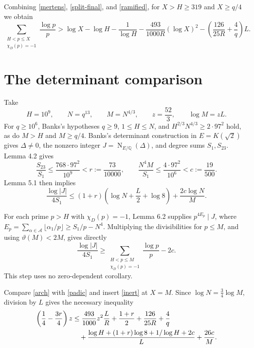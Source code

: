 \documentclass[11pt]{article}
\newcommand{\Q}{\mathbb Q}
\begin{document}
Combining \eqref{mertens}, \eqref{split-final}, and \eqref{ramified},
for \(X>H\ge319\) and \(X\ge q/4\) we obtain
\begin{equation}\label{inert}
 \sum_{\substack{H<p\le X\\\chi_D(p)=-1}}\frac{\log p}{p}
 >\log X-\log H-\frac1{\log H}
  -\frac{493}{1000R}(\log X)^2
  -\left(\frac{126}{25R}+\frac4q\right)L.
\end{equation}

\section{The determinant comparison}

Take
\[
 H=10^9,\qquad N=q^{13},\qquad M=N^{4/3},\qquad
 z=\frac{52}{3},\qquad \log M=zL.
\]
For \(q\ge10^6\), Banks's hypotheses
\(q\ge9\), \(1\le H\le N\), and
\(H^{2/3}N^{4/3}\ge2\cdot97^2\) hold, as do \(M>H\) and \(M\ge q/4\).
Banks's determinant construction in \(E=K(\sqrt2)\) gives
\(\Delta\ne0\), the nonzero integer
\(J=\operatorname{N}_{E/\Q}(\Delta)\), and degree sums \(S_1,S_{23}\).
Lemma 4.2 gives
\[
 \frac{S_{23}}{S_1}\le\frac{768\cdot97^2}{10^9}
                  <r:=\frac{73}{10000},\qquad
 \frac{N^4M}{S_1}\le\frac{4\cdot97^2}{10^6}
                  <c:=\frac{19}{500}.
\]
Lemma 5.1 then implies
\begin{equation}\label{arch}
 \frac{\log|J|}{4S_1}
 \le(1+r)\left(\log N+\frac L2+\log8\right)
                         +\frac{2c\log N}{M}.
\end{equation}

For each prime \(p>H\) with \(\chi_D(p)=-1\), Lemma 6.2 supplies
\(p^{4E_p}\mid J\), where
\(E_p=\sum_{\alpha\in\mathcal A}\lfloor\alpha_1/p\rfloor
\ge S_1/p-N^4\). Multiplying the divisibilities for \(p\le M\), and
using \(\vartheta(M)<2M\), gives directly
\begin{equation}\label{padic}
 \frac{\log|J|}{4S_1}
 \ge\sum_{\substack{H<p\le M\\\chi_D(p)=-1}}\frac{\log p}{p}-2c.
\end{equation}
This step uses no zero-dependent corollary.

Compare \eqref{arch} with \eqref{padic} and insert \eqref{inert}
at \(X=M\). Since \(\log N=\tfrac34\log M\), division by \(L\)
gives the necessary inequality
\begin{align}
 \left(\frac14-\frac{3r}{4}\right)z
 &\le \frac{493}{1000}z^2\frac{L}{R}
       +\frac{1+r}{2}+\frac{126}{25R}+\frac4q \notag\\
 &\quad+\frac{\log H+(1+r)\log8+1/\log H+2c}{L}
       +\frac{26c}{M}.\label{necessary}
\end{align}
\end{document}
